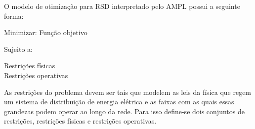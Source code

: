 O modelo de otimização para RSD interpretado pelo AMPL possui a seguinte forma:

\begin{tcolorbox}[colback=white!10,title =\textbf{Modelo de um problema de otimização para RDS}]
    \begin{minipage}{\dimexpr\textwidth-\shadowsize-2\fboxrule-2\fboxsep-8pt}
    
    \begin{center}
        Minimizar: Função objetivo        
    \end{center}

    \hspace{2cm}Sujeito a:

    \begin{center}
        Restrições físicas\\
        Restrições operativas\\
    \end{center}
    \end{minipage}
\end{tcolorbox}


As restrições do problema devem ser tais que modelem as leis da física que regem um sistema de distribuição de energia elétrica e as faixas com as quais essas grandezas podem operar ao longo da rede.
Para isso define-se dois conjuntos de restrições, restrições físicas e restrições operativas.